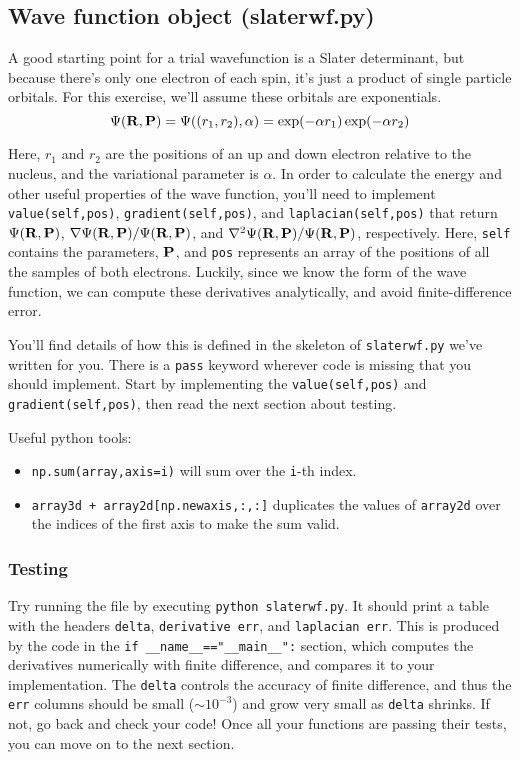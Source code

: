 \documentclass[12pt]{article}
\newcommand{\bR}{{\bf R}}
\newcommand{\bP}{{\bf P}}
\begin{document}
\subsection{Wave function object (slaterwf.py)}

A good starting point for a trial wavefunction is a Slater determinant, but because there's only one electron of each spin, it's just a product of single particle orbitals. 
For this exercise, we'll assume these orbitals are exponentials.
\begin{equation}
  \Psi(\bR,\bP)
  =
  \Psi((r_1,r_2),\alpha)
  =
  \exp(-\alpha r_1) \exp(-\alpha r_2)	
\end{equation}

Here, $r_1$ and $r_2$ are the positions of an up and down electron relative to the nucleus, and the variational parameter is $\alpha$.
In order to calculate the energy and other useful properties of the wave function, you'll need to implement \verb|value(self,pos)|, \verb|gradient(self,pos)|, and \verb|laplacian(self,pos)| that return $\Psi(\bR,\bP)$, $\nabla \Psi(\bR,\bP)/\Psi(\bR,\bP)$, and $\nabla^2 \Psi(\bR,\bP)/\Psi(\bR,\bP)$, respectively. 
Here, \verb|self| contains the parameters, $\bP$, and \verb|pos| represents an array of the positions of all the samples of both electrons. 
Luckily, since we know the form of the wave function, we can compute these derivatives analytically, and avoid finite-difference error.

You'll find details of how this is defined in the skeleton of \verb|slaterwf.py| we've written for you.
There is a \verb|pass| keyword wherever code is missing that you should implement. 
Start by implementing the \verb|value(self,pos)| and \verb|gradient(self,pos)|, then read the next section about testing.

Useful python tools:
\begin{itemize}
  \item
    \verb|np.sum(array,axis=i)| will sum over the \verb|i|-th index.
  \item
    \verb|array3d + array2d[np.newaxis,:,:]| duplicates the values of \verb|array2d| over the indices of the first axis to make the sum valid.
\end{itemize}

\subsubsection{Testing}

Try running the file by executing \verb|python slaterwf.py|. 
It should print a table with the headers \verb|delta|, \verb|derivative err|, and \verb|laplacian err|. 
This is produced by the code in the \verb|if __name__=="__main__":| section, which computes the derivatives numerically with finite difference, and compares it to your implementation. 
The \verb|delta| controls the accuracy of finite difference, and thus the \verb|err| columns should be small ($\sim 10^{-3}$) and grow very small as \verb|delta| shrinks.
If not, go back and check your code!
Once all your functions are passing their tests, you can move on to the next section.
\end{document}
